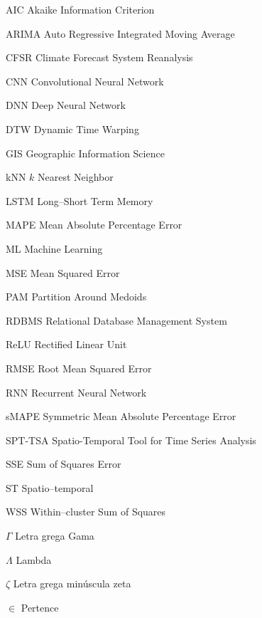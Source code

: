 \documentclass[
	final,				%
	12pt,				%
	openright,			%
	oneside,			%
	a4paper,			%
	hyphens,            %
	sumario=tradicional,%
	english,			%
	french,				%
	spanish,			%
	brazil				%
	]{abntex2}
\begin{document}
\begin{siglas}
  \item[AIC] Akaike Information Criterion
  \item[ARIMA] Auto Regressive Integrated Moving Average
  \item[CFSR] Climate Forecast System Reanalysis
  \item[CNN] Convolutional Neural Network
  \item[DNN] Deep Neural Network
  \item[DTW] Dynamic Time Warping
  \item[GIS] Geographic Information Science  
  \item[kNN] $k$ Nearest Neighbor
  \item[LSTM] Long--Short Term Memory
  \item[MAPE] Mean Absolute Percentage Error
  \item[ML] Machine Learning
  \item[MSE] Mean Squared Error
  \item[PAM] Partition Around Medoids
  \item[RDBMS] Relational Database Management System
  \item[ReLU] Rectified Linear Unit
  \item[RMSE] Root Mean Squared Error
  \item[RNN] Recurrent Neural Network
  \item[sMAPE] Symmetric Mean Absolute Percentage Error
  \item[SPT-TSA] Spatio-Temporal Tool for Time Series Analysis
  \item[SSE] Sum of Squares Error
  \item[ST] Spatio--temporal
  \item[WSS] Within--cluster Sum of Squares
\end{siglas}

\begin{simbolos}
  \item[$ \Gamma $] Letra grega Gama
  \item[$ \Lambda $] Lambda
  \item[$ \zeta $] Letra grega minúscula zeta
  \item[$ \in $] Pertence
\end{simbolos}

\tableofcontents*
\cleardoublepage
\end{document}
